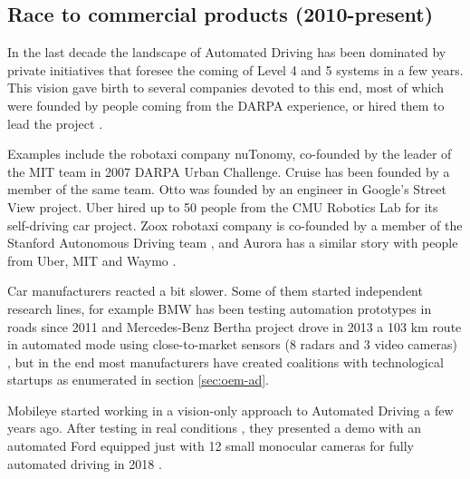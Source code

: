 \subsection{Race to commercial products (2010-present)}
 
In the last decade the landscape of Automated Driving has been dominated by 
private initiatives that foresee the coming of Level 4 and 5 systems in a few 
years. This vision gave birth to several companies devoted to this end, most of 
which were founded by people coming from the DARPA experience, or hired them to
lead the project \cite{Chapell2016}. 

Examples include the robotaxi company nuTonomy, co-founded
by the leader of the MIT team in 2007 DARPA Urban Challenge. Cruise has been
founded by a member of the same team.
Otto was founded by an engineer in Google's Street View project.
Uber hired up to 50 people from the CMU Robotics Lab for its self-driving car 
project. Zoox robotaxi company is co-founded by a member of the Stanford 
Autonomous Driving team %
\cite{Levinson2011a}, and Aurora has a similar story with people from 
Uber, MIT and Waymo \cite{Anderson2013}.

Car manufacturers reacted a bit slower. 
Some of them started independent research lines, for example
BMW has been testing automation prototypes in roads since 2011 
\cite{Aeberhard2015a} and Mercedes-Benz Bertha project \cite{Ziegler2014}
drove in 2013 a 103 km route in automated
mode using close-to-market sensors (8 radars and 3 video cameras)
, but in the end most manufacturers have created coalitions with technological
startups as enumerated in section \ref{sec:oem-ad}.


Mobileye started working in a vision-only approach to Automated Driving
\cite{Mobileye2018} a few years ago. 
After testing in real conditions \cite{Edelstein2018}, they presented a demo with an automated Ford equipped just with 12 small monocular cameras for fully automated driving in 2018 \cite{Scheer2018}.

